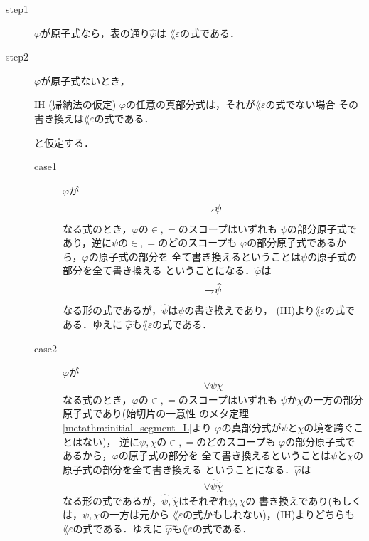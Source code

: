 	\begin{metaprf}\mbox{}
		\begin{description}
			\item[step1] $\varphi$が原子式なら，表の通り$\widehat{\varphi}$は
				$\lang{\varepsilon}$の式である．
			
			\item[step2] $\varphi$が原子式ないとき，
				\begin{itembox}[l]{IH (帰納法の仮定)}
					$\varphi$の任意の真部分式は，それが$\lang{\varepsilon}$の式でない場合
					その書き換えは$\lang{\varepsilon}$の式である．
				\end{itembox}
				と仮定する．
				\begin{description}
					\item[case1] $\varphi$が
						\begin{align}
							\rightharpoondown\hspace{-0.25em} \psi
						\end{align}
						なる式のとき，$\varphi$の$\in,=$のスコープはいずれも
						$\psi$の部分原子式であり，逆に$\psi$の$\in,=$のどのスコープも
						$\varphi$の部分原子式であるから，$\varphi$の原子式の部分を
						全て書き換えるということは$\psi$の原子式の部分を全て書き換える
						ということになる．$\widehat{\varphi}$は
						\begin{align}
							\rightharpoondown\hspace{-0.25em} \widehat{\psi}
						\end{align}
						なる形の式であるが，$\widehat{\psi}$は$\psi$の書き換えであり，
						(IH)より$\lang{\varepsilon}$の式である．ゆえに
						$\widehat{\varphi}$も$\lang{\varepsilon}$の式である．
						
					\item[case2] $\varphi$が
						\begin{align}
							\vee \psi \chi
						\end{align}
						なる式のとき，$\varphi$の$\in,=$のスコープはいずれも
						$\psi$か$\chi$の一方の部分原子式であり(始切片の一意性
						のメタ定理\ref{metathm:initial_segment_L}より
						$\varphi$の真部分式が$\psi$と$\chi$の境を跨ぐことはない)，
						逆に$\psi,\chi$の$\in,=$のどのスコープも
						$\varphi$の部分原子式であるから，$\varphi$の原子式の部分を
						全て書き換えるということは$\psi$と$\chi$の原子式の部分を全て書き換える
						ということになる．$\widehat{\varphi}$は
						\begin{align}
							\vee \widehat{\psi} \widehat{\chi}
						\end{align}
						なる形の式であるが，$\widehat{\psi},\widehat{\chi}$はそれぞれ$\psi,\chi$の
						書き換えであり(もしくは，$\psi,\chi$の一方は元から
						$\lang{\varepsilon}$の式かもしれない)，(IH)よりどちらも
						$\lang{\varepsilon}$の式である．ゆえに
						$\widehat{\varphi}$も$\lang{\varepsilon}$の式である．
						

\end{description}
\end{description}
\end{metaprf}
